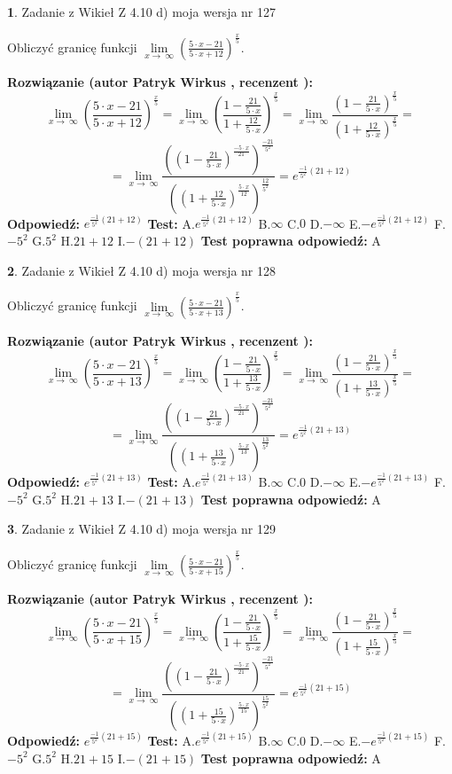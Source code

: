 \documentclass[12pt, a4paper]{article}
\theoremstyle{definition} %
\newtheorem{zad}{}
\newcommand{\zadStart}[1]{\begin{zad}#1\newline}
\newcommand{\zadStop}{\end{zad}}
\newcommand{\rozwStart}[2]{\noindent \textbf{Rozwiązanie (autor #1 , recenzent #2): }\newline}
\newcommand{\rozwStop}{\newline}
\newcommand{\odpStart}{\noindent \textbf{Odpowiedź:}\newline}
\newcommand{\odpStop}{\newline}
\newcommand{\testStart}{\noindent \textbf{Test:}\newline}
\newcommand{\testStop}{\newline}
\newcommand{\kluczStart}{\noindent \textbf{Test poprawna odpowiedź:}\newline}
\newcommand{\kluczStop}{\newline}
\begin{document}
\zadStart{Zadanie z Wikieł Z 4.10 d) moja wersja nr 127}


Obliczyć granicę funkcji  $\lim\limits_{x\to\ \infty}(\frac{5\cdot x-21}{5\cdot x+12})^{\frac{x}{5}}$.
\zadStop
\rozwStart{Patryk Wirkus}{}
$$\lim\limits_{x\to\ \infty}(\frac{5\cdot x-21}{5\cdot x+12})^{\frac{x}{5}} = \lim\limits_{x\to\ \infty}(\frac{1-\frac{21}{5\cdot x}}{1+\frac{12}{5\cdot x}})^{\frac{x}{5}}=\lim\limits_{x\to\ \infty}\frac{(1-\frac{21}{5\cdot x})^{\frac{x}{5}}}{(1+\frac{12}{5\cdot x})^{\frac{x}{5}}}=$$
$$=\lim\limits_{x\to\ \infty}\frac{((1-\frac{21}{5\cdot x})^{\frac{-5\cdot x}{21}})^{\frac{-21}{5^{2}}}}{((1+\frac{12}{5\cdot x})^{\frac{5\cdot x}{12}})^{\frac{12}{5^{2}}}}=e^{\frac{-1}{5^{2}}(21+12)}$$
\rozwStop
\odpStart
$e^{\frac{-1}{5^{2}}(21+12)}$
\odpStop
\testStart
A.$e^{\frac{-1}{5^{2}}(21+12)}$ B.$\infty$ C.$0$ D.$-\infty$ E.$-e^{\frac{-1}{5^{2}}(21+12)}$
F.$-5^{2}$ G.$5^{2}$
H.$21+12$
I.$-(21+12)$
\testStop
\kluczStart
A
\kluczStop



\zadStart{Zadanie z Wikieł Z 4.10 d) moja wersja nr 128}


Obliczyć granicę funkcji  $\lim\limits_{x\to\ \infty}(\frac{5\cdot x-21}{5\cdot x+13})^{\frac{x}{5}}$.
\zadStop
\rozwStart{Patryk Wirkus}{}
$$\lim\limits_{x\to\ \infty}(\frac{5\cdot x-21}{5\cdot x+13})^{\frac{x}{5}} = \lim\limits_{x\to\ \infty}(\frac{1-\frac{21}{5\cdot x}}{1+\frac{13}{5\cdot x}})^{\frac{x}{5}}=\lim\limits_{x\to\ \infty}\frac{(1-\frac{21}{5\cdot x})^{\frac{x}{5}}}{(1+\frac{13}{5\cdot x})^{\frac{x}{5}}}=$$
$$=\lim\limits_{x\to\ \infty}\frac{((1-\frac{21}{5\cdot x})^{\frac{-5\cdot x}{21}})^{\frac{-21}{5^{2}}}}{((1+\frac{13}{5\cdot x})^{\frac{5\cdot x}{13}})^{\frac{13}{5^{2}}}}=e^{\frac{-1}{5^{2}}(21+13)}$$
\rozwStop
\odpStart
$e^{\frac{-1}{5^{2}}(21+13)}$
\odpStop
\testStart
A.$e^{\frac{-1}{5^{2}}(21+13)}$ B.$\infty$ C.$0$ D.$-\infty$ E.$-e^{\frac{-1}{5^{2}}(21+13)}$
F.$-5^{2}$ G.$5^{2}$
H.$21+13$
I.$-(21+13)$
\testStop
\kluczStart
A
\kluczStop



\zadStart{Zadanie z Wikieł Z 4.10 d) moja wersja nr 129}


Obliczyć granicę funkcji  $\lim\limits_{x\to\ \infty}(\frac{5\cdot x-21}{5\cdot x+15})^{\frac{x}{5}}$.
\zadStop
\rozwStart{Patryk Wirkus}{}
$$\lim\limits_{x\to\ \infty}(\frac{5\cdot x-21}{5\cdot x+15})^{\frac{x}{5}} = \lim\limits_{x\to\ \infty}(\frac{1-\frac{21}{5\cdot x}}{1+\frac{15}{5\cdot x}})^{\frac{x}{5}}=\lim\limits_{x\to\ \infty}\frac{(1-\frac{21}{5\cdot x})^{\frac{x}{5}}}{(1+\frac{15}{5\cdot x})^{\frac{x}{5}}}=$$
$$=\lim\limits_{x\to\ \infty}\frac{((1-\frac{21}{5\cdot x})^{\frac{-5\cdot x}{21}})^{\frac{-21}{5^{2}}}}{((1+\frac{15}{5\cdot x})^{\frac{5\cdot x}{15}})^{\frac{15}{5^{2}}}}=e^{\frac{-1}{5^{2}}(21+15)}$$
\rozwStop
\odpStart
$e^{\frac{-1}{5^{2}}(21+15)}$
\odpStop
\testStart
A.$e^{\frac{-1}{5^{2}}(21+15)}$ B.$\infty$ C.$0$ D.$-\infty$ E.$-e^{\frac{-1}{5^{2}}(21+15)}$
F.$-5^{2}$ G.$5^{2}$
H.$21+15$
I.$-(21+15)$
\testStop
\kluczStart
A
\kluczStop
\end{document}
